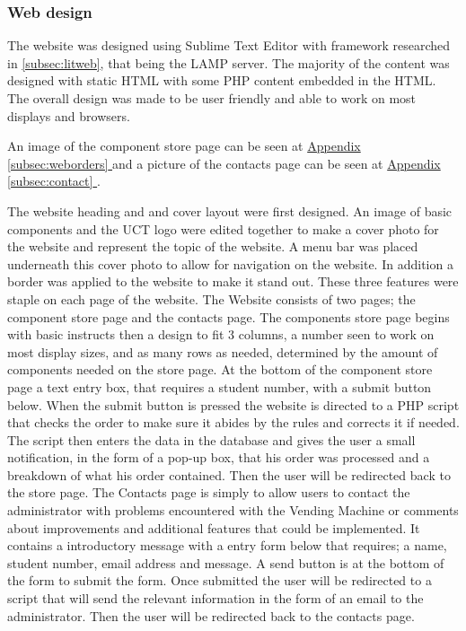 \documentclass[a4paper,11pt]{article}
\newcommand*{\fullref}[1]{\hyperref[{#1}]{\Appendixautorefname  \ref*{#1} \nameref*{#1}}}
\newcommand*{\Appendixautorefname}{Appendix }
\numberwithin{figure}{section}
\numberwithin{table}{section}
\begin{document}
\subsubsection{Web design}
\label{subsubsec:webdev}

The website was designed using Sublime Text Editor with framework researched in \autoref{subsec:litweb}, that being the LAMP server. The majority of the content was designed with static HTML with some PHP content embedded in the HTML. The overall design was made to be user friendly and able to work on most displays and browsers.

An image of the component store page can be seen at \fullref{subsec:weborders} and a picture of the contacts page can be seen at \fullref{subsec:contact}.

The website heading and and cover layout were first designed. An image of basic components and the UCT logo were edited together to make a cover photo for the website and represent the topic of the website. A menu bar was placed underneath this cover photo to allow for navigation on the website. In addition a border was applied to the website to make it stand out. These three features were staple on each page of the website. The Website consists of two pages; the component store page and the contacts page. The components store page begins with basic instructs then a design to fit 3 columns, a number seen to work on most display sizes, and as many rows as needed, determined by the amount of components needed on the store page. At the bottom of the component store page a text entry box, that requires a student number, with a submit button below. When the submit button is pressed the website is directed to a PHP script that checks the order to make sure it abides by the rules and corrects it if needed. The script then enters the data in the database and gives the user a small notification, in the form of a pop-up box, that his order was processed and a breakdown of what his order contained. Then the user will be redirected back to the store page. The Contacts page is simply to allow users to contact the administrator with problems encountered with the Vending Machine or comments about improvements and additional features that could be implemented. It contains a introductory message with a entry form below that requires; a name, student number, email address and message. A send button is at the bottom of the form to submit the form. Once submitted the user will be redirected to a script that will send the relevant information in the form of an email to the administrator. Then the user will be redirected back to the contacts page.
\end{document}
